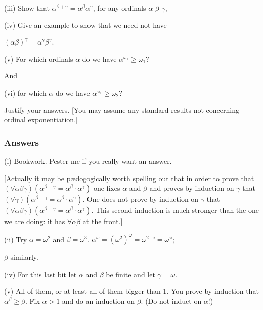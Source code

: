 \documentclass{book}
\begin{document}
\noindent (iii) Show that
$\alpha^{\beta+\gamma}=\alpha^\beta \alpha^\gamma$, for any ordinals
$\alpha$ $\beta$ $\gamma$,

\smallskip

\noindent(iv) Give an example to show that we need not have

$(\alpha\beta)^\gamma = \alpha^\gamma \beta^\gamma$.

\smallskip

\noindent (v) For which ordinals $\alpha$ do we have $\alpha^{\omega_1} \geq \omega_1$?

\smallskip

And

\noindent (vi)  for which $\alpha$ do we have $\alpha^{\omega_1} \geq \omega_2$?

Justify your answers.
[You may assume any standard results not concerning ordinal exponentiation.]

\subsubsection*{Answers}

(i) Bookwork. Pester me if you really want an answer.

[Actually it may be p{\ae}dogogically worth spelling out that in order
  to prove that $(\forall \alpha \beta \gamma)(\alpha^{\beta+\gamma} =
  \alpha^\beta \cdot \alpha^\gamma)$ one fixes $\alpha$ and $\beta$
  and proves by induction on $\gamma$ that $(\forall
  \gamma)(\alpha^{\beta+\gamma}= \alpha^\beta \cdot \alpha^\gamma)$.
  One does not prove by induction on $\gamma$ that $(\forall \alpha
  \beta \gamma)(\alpha^{\beta+\gamma}= \alpha^\beta \cdot \alpha^\gamma)$.
  This second induction is much stronger than the one we are doing:
  it has $\forall \alpha \beta$ at the front.]

\smallskip

(ii) Try $\alpha = \omega^2$ and $\beta = \omega^3$.
$\alpha^\omega =(\omega^2)^\omega = \omega^{2\cdot\omega} = \omega^\omega$;

$\beta$ similarly.

\smallskip

(iv) For this last bit let $\alpha$ and $\beta$ be finite and let
$\gamma = \omega$.

\smallskip

(v) All of them, or at least all of them bigger than 1.   You prove by
induction that $\alpha^\beta \geq \beta$.  Fix $\alpha > 1$ and do an
induction on $\beta$. (Do not induct on $\alpha$!)
\end{document}
